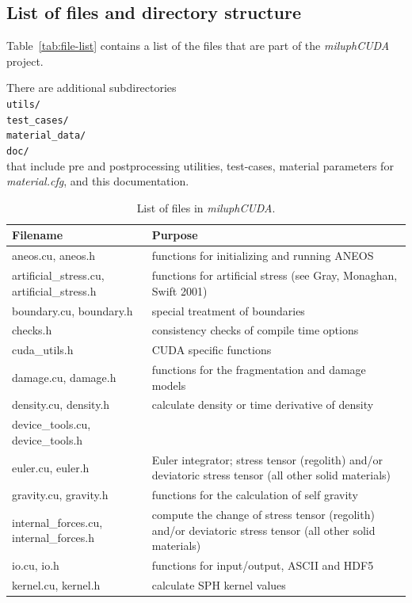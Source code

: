 \documentclass[10pt,fleqn,twoside]{article}
\begin{document}
\subsection{List of files and directory structure}
Table~\ref{tab:file-list} contains a list of the files that are part of the \emph{miluphCUDA} project.

There are additional subdirectories\\
\verb|utils/|\\
\verb|test_cases/|\\
\verb|material_data/|\\
\verb|doc/|\\
that include pre and postprocessing utilities, test-cases, material parameters for \emph{material.cfg}, and this documentation.

\begin{table}
\centering
\caption{List of files in \emph{miluphCUDA}.}
\small
\begin{tabular}[b]{p{6cm} p{9cm}}
\hline
Filename	&	Purpose		\\
\hline
aneos.cu, aneos.h	&	functions for initializing and running ANEOS	\\
artificial\_stress.cu, artificial\_stress.h	&	functions for artificial stress (see Gray, Monaghan, Swift 2001)\\
boundary.cu, boundary.h		&	special treatment of boundaries	\\
checks.h	&	consistency checks of compile time options	\\
cuda\_utils.h	&	CUDA specific functions	\\
damage.cu, damage.h		&	functions for the fragmentation and damage models	\\
density.cu, density.h	&	calculate density or time derivative of density	\\
device\_tools.cu, device\_tools.h		&	\\
euler.cu, euler.h	&	Euler integrator; stress tensor (regolith) and/or deviatoric stress tensor (all other solid materials)	\\
gravity.cu, gravity.h	& functions for the calculation of self gravity \\
internal\_forces.cu, internal\_forces.h	&	compute the change of stress tensor (regolith) and/or deviatoric stress tensor (all other solid materials)	\\
io.cu, io.h		&	functions for input/output, ASCII and HDF5	\\
kernel.cu, kernel.h		&	calculate SPH kernel values	\\

\end{tabular}
\end{table}
\end{document}
